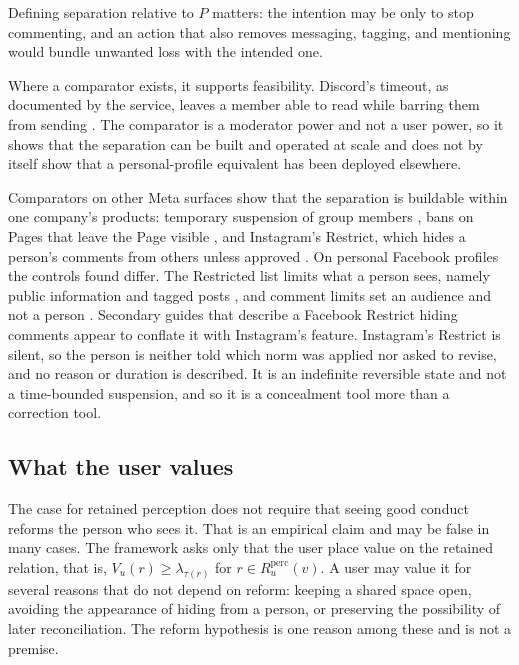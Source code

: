 Defining separation relative to $P$ matters: the intention may be only to stop commenting, and an action that also removes messaging, tagging, and mentioning would bundle unwanted loss with the intended one.

Where a comparator exists, it supports feasibility. Discord's timeout, as documented by the service, leaves a member able to read while barring them from sending \cite{discord-timeout}. The comparator is a moderator power and not a user power, so it shows that the separation can be built and operated at scale and does not by itself show that a personal-profile equivalent has been deployed elsewhere.

\begin{remark}
Comparators on other Meta surfaces show that the separation is buildable within one company's products: temporary suspension of group members \cite{fb-groups}, bans on Pages that leave the Page visible \cite{page-ban}, and Instagram's Restrict, which hides a person's comments from others unless approved \cite{ig-restrict}. On personal Facebook profiles the controls found differ. The Restricted list limits what a person sees, namely public information and tagged posts \cite{fb-restricted}, and comment limits set an audience and not a person \cite{fb-comments}. Secondary guides that describe a Facebook Restrict hiding comments appear to conflate it with Instagram's feature. Instagram's Restrict is silent, so the person is neither told which norm was applied nor asked to revise, and no reason or duration is described. It is an indefinite reversible state and not a time-bounded suspension, and so it is a concealment tool more than a correction tool.
\end{remark}

\subsection{What the user values}

The case for retained perception does not require that seeing good conduct reforms the person who sees it. That is an empirical claim and may be false in many cases. The framework asks only that the user place value on the retained relation, that is, $V_u(r)\ge\lambda_{\tau(r)}$ for $r\in R_u^{\mathrm{perc}}(v)$. A user may value it for several reasons that do not depend on reform: keeping a shared space open, avoiding the appearance of hiding from a person, or preserving the possibility of later reconciliation. The reform hypothesis is one reason among these and is not a premise.

